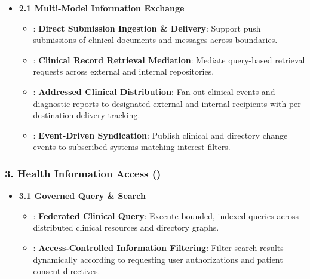 \begin{itemize}

\item 
\textbf{2.1 Multi-Model Information Exchange}


\begin{itemize}

\item 
\texttt{}: \textbf{Direct Submission Ingestion \& Delivery}: Support push submissions of clinical documents and messages across boundaries.



\item 
\texttt{}: \textbf{Clinical Record Retrieval Mediation}: Mediate query-based retrieval requests across external and internal repositories.



\item 
\texttt{}: \textbf{Addressed Clinical Distribution}: Fan out clinical events and diagnostic reports to designated external and internal recipients with per-destination delivery tracking.



\item 
\texttt{}: \textbf{Event-Driven Syndication}: Publish clinical and directory change events to subscribed systems matching interest filters.



\end{itemize}


\end{itemize}
\label{rad:enabling:621}
\subsubsection*{3. Health Information Access (\texttt{})}
\label{rad:enabling:622}

\begin{itemize}

\item 
\textbf{3.1 Governed Query \& Search}


\begin{itemize}

\item 
\texttt{}: \textbf{Federated Clinical Query}: Execute bounded, indexed queries across distributed clinical resources and directory graphs.



\item 
\texttt{}: \textbf{Access-Controlled Information Filtering}: Filter search results dynamically according to requesting user authorizations and patient consent directives.



\end{itemize}


\end{itemize}
\label{rad:enabling:626}
